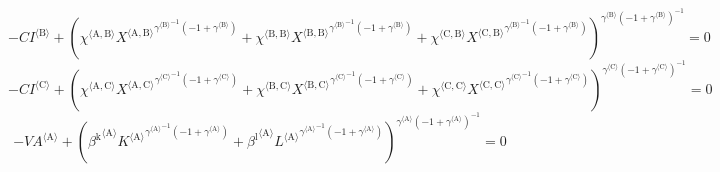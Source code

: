 \begin{equation}
-{{C\!I}}^{\langle \mathrm{B}\rangle} + \left({{\chi}^{\langle \mathrm{\mathrm{A}},\mathrm{\mathrm{B}}\rangle}} {{{X}^{\langle \mathrm{A},\mathrm{B}\rangle}}^{{{\gamma}^{\langle \mathrm{\mathrm{B}}\rangle}}^{-1} \left(-1 + {\gamma}^{\langle \mathrm{\mathrm{B}}\rangle}\right)}} + {{\chi}^{\langle \mathrm{\mathrm{B}},\mathrm{\mathrm{B}}\rangle}} {{{X}^{\langle \mathrm{B},\mathrm{B}\rangle}}^{{{\gamma}^{\langle \mathrm{\mathrm{B}}\rangle}}^{-1} \left(-1 + {\gamma}^{\langle \mathrm{\mathrm{B}}\rangle}\right)}} + {{\chi}^{\langle \mathrm{\mathrm{C}},\mathrm{\mathrm{B}}\rangle}} {{{X}^{\langle \mathrm{C},\mathrm{B}\rangle}}^{{{\gamma}^{\langle \mathrm{\mathrm{B}}\rangle}}^{-1} \left(-1 + {\gamma}^{\langle \mathrm{\mathrm{B}}\rangle}\right)}}\right)^{{{\gamma}^{\langle \mathrm{\mathrm{B}}\rangle}} \left(-1 + {\gamma}^{\langle \mathrm{\mathrm{B}}\rangle}\right)^{-1}} = 0
\end{equation}
\begin{equation}
-{{C\!I}}^{\langle \mathrm{C}\rangle} + \left({{\chi}^{\langle \mathrm{\mathrm{A}},\mathrm{\mathrm{C}}\rangle}} {{{X}^{\langle \mathrm{A},\mathrm{C}\rangle}}^{{{\gamma}^{\langle \mathrm{\mathrm{C}}\rangle}}^{-1} \left(-1 + {\gamma}^{\langle \mathrm{\mathrm{C}}\rangle}\right)}} + {{\chi}^{\langle \mathrm{\mathrm{B}},\mathrm{\mathrm{C}}\rangle}} {{{X}^{\langle \mathrm{B},\mathrm{C}\rangle}}^{{{\gamma}^{\langle \mathrm{\mathrm{C}}\rangle}}^{-1} \left(-1 + {\gamma}^{\langle \mathrm{\mathrm{C}}\rangle}\right)}} + {{\chi}^{\langle \mathrm{\mathrm{C}},\mathrm{\mathrm{C}}\rangle}} {{{X}^{\langle \mathrm{C},\mathrm{C}\rangle}}^{{{\gamma}^{\langle \mathrm{\mathrm{C}}\rangle}}^{-1} \left(-1 + {\gamma}^{\langle \mathrm{\mathrm{C}}\rangle}\right)}}\right)^{{{\gamma}^{\langle \mathrm{\mathrm{C}}\rangle}} \left(-1 + {\gamma}^{\langle \mathrm{\mathrm{C}}\rangle}\right)^{-1}} = 0
\end{equation}
\begin{equation}
-{{V\!A}}^{\langle \mathrm{A}\rangle} + \left({{\beta^{\mathrm{k}}}^{\langle \mathrm{\mathrm{A}}\rangle}} {{{K}^{\langle \mathrm{A}\rangle}}^{{{\gamma}^{\langle \mathrm{\mathrm{A}}\rangle}}^{-1} \left(-1 + {\gamma}^{\langle \mathrm{\mathrm{A}}\rangle}\right)}} + {{\beta^{\mathrm{l}}}^{\langle \mathrm{\mathrm{A}}\rangle}} {{{L}^{\langle \mathrm{A}\rangle}}^{{{\gamma}^{\langle \mathrm{\mathrm{A}}\rangle}}^{-1} \left(-1 + {\gamma}^{\langle \mathrm{\mathrm{A}}\rangle}\right)}}\right)^{{{\gamma}^{\langle \mathrm{\mathrm{A}}\rangle}} \left(-1 + {\gamma}^{\langle \mathrm{\mathrm{A}}\rangle}\right)^{-1}} = 0
\end{equation}
